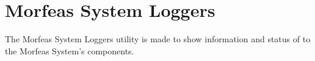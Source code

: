 \section{Morfeas System Loggers}
The Morfeas System Loggers utility is made to show information and status of to the Morfeas System's components.
 